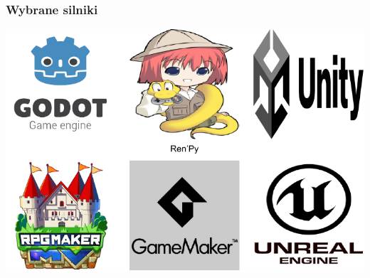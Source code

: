 \documentclass{beamer}
\begin{document}
{
\begin{frame}
\end{frame}
}

\begin{frame}
  \frametitle{Wybrane silniki}
  \begin{center}    
  \includegraphics[width=0.8\paperwidth, height=0.8\paperheight]{usedEngines.pdf}
\end{center}
\end{frame}
\end{document}
